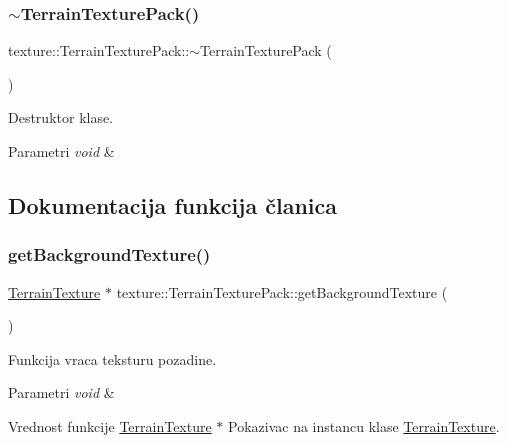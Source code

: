 \subsubsection{\texorpdfstring{$\sim$\+Terrain\+Texture\+Pack()}{~TerrainTexturePack()}}
{\footnotesize\ttfamily texture\+::\+Terrain\+Texture\+Pack\+::$\sim$\+Terrain\+Texture\+Pack (\begin{DoxyParamCaption}{ }\end{DoxyParamCaption})}



Destruktor klase. 


\begin{DoxyParams}{Parametri}
{\em void} & \\
\hline
\end{DoxyParams}


\subsection{Dokumentacija funkcija članica}
\mbox{\label{classtexture_1_1TerrainTexturePack_afcc4cf5d8e58eb3668cb0bb0e92ac6d9}} 
\subsubsection{\texorpdfstring{get\+Background\+Texture()}{getBackgroundTexture()}}
{\footnotesize\ttfamily \hyperlink{classtexture_1_1TerrainTexture}{Terrain\+Texture} $\ast$ texture\+::\+Terrain\+Texture\+Pack\+::get\+Background\+Texture (\begin{DoxyParamCaption}{ }\end{DoxyParamCaption})}



Funkcija vraca teksturu pozadine. 


\begin{DoxyParams}{Parametri}
{\em void} & \\
\hline
\end{DoxyParams}
\begin{DoxyReturn}{Vrednost funkcije}
\hyperlink{classtexture_1_1TerrainTexture}{Terrain\+Texture} $\ast$ Pokazivac na instancu klase \hyperlink{classtexture_1_1TerrainTexture}{Terrain\+Texture}. 
\end{DoxyReturn}
\mbox{\label{classtexture_1_1TerrainTexturePack_a458ca66ed71f945af5e3878de073bb33}} 
